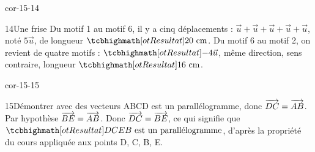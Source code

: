 \begin{blocLivre}{cor-15-14}\begin{corrige}{14}{Une frise}
Du motif 1 au motif 6, il y a cinq déplacements : $\vec u+\vec u+\vec u+\vec u+\vec u$, noté $5\vec u$, de longueur $\res{20\text{ cm}}$. Du motif 6 au motif 2, on revient de quatre motifs : $\res{-4\vec u}$, même direction, sens contraire, longueur $\res{16\text{ cm}}$.
\label{fig-cor-15-14}
\end{corrige}\end{blocLivre}
\begin{blocLivre}{cor-15-15}\begin{corrige}{15}{Démontrer avec des vecteurs}
ABCD est un parallélogramme, donc $\overrightarrow{DC}=\overrightarrow{AB}$. Par hypothèse $\overrightarrow{BE}=\overrightarrow{AB}$. Donc $\overrightarrow{DC}=\overrightarrow{BE}$, ce qui signifie que $\res{DCEB\text{ est un parallélogramme}}$, d’après la propriété du cours appliquée aux points D, C, B, E.
\label{fig-cor-15-15}
\end{corrige}\end{blocLivre}

